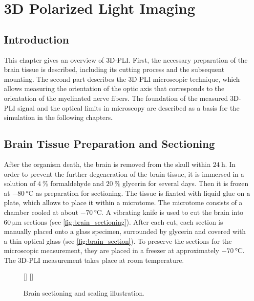 \cleardoublepage
\setcounter{chapter}{3}
\chapter{3D Polarized Light Imaging}
\label{sec:pli}
%
\section{Introduction}
% 
This chapter gives an overview of \ac{3D-PLI}.
First, the necessary preparation of the brain tissue is described, including its cutting process and the subsequent mounting.
The second part describes the \ac{3D-PLI} microscopic technique, which allows measuring the orientation of the optic axis that corresponds to the orientation of the myelinated nerve fibers.
The foundation of the measured \ac{3D-PLI} signal and the optical limits in microscopy are described as a basis for the simulation in the following chapters. 
% 
% 
% 
\section{Brain Tissue Preparation and Sectioning}
% 
After the organism death, the brain is removed from the skull within $\SI{24}{\hour}$.
In order to prevent the further degeneration of the brain tissue, it is immersed in a solution of $\SI{4}{\percent}$ formaldehyde and $\SI{20}{\percent}$ glycerin for several days.
Then it is frozen at $\SI{-80}{\celsius}$ as preparation for sectioning.
The tissue is fixated with liquid glue on a plate, which allows to place it within a microtome.
The microtome consists of a chamber cooled at about $\SI{-70}{\celsius}$.
A vibrating knife is used to cut the brain into $\SI{60}{\micro\meter}$ sections (see \cref{fig:brain_sectioning}).
After each cut, each section is manually placed onto a glass specimen, surrounded by glycerin and covered with a thin optical glass (see \cref{fig:brain_section}).
To preserve the sections for the microscopic measurement, they are placed in a freezer at approximately $\SI{-70}{\celsius}$.
The \ac{3D-PLI} measurement takes place at room temperature. \cite{Axer2011}
% 
\begin{figure}[!t]
	\centering
    \setlength{\tikzwidth}{0.475\textwidth}
    [\tikzwidth]{}
    \hfill
    [\tikzwidth]{}
	\caption[]{Brain sectioning and sealing illustration.}
\end{figure}
% 
% 
% 
